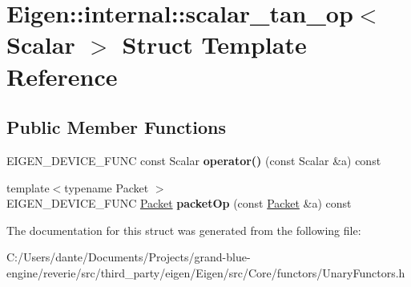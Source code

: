\hypertarget{struct_eigen_1_1internal_1_1scalar__tan__op}{}\section{Eigen\+::internal\+::scalar\+\_\+tan\+\_\+op$<$ Scalar $>$ Struct Template Reference}
\label{struct_eigen_1_1internal_1_1scalar__tan__op}
\subsection*{Public Member Functions}
\begin{DoxyCompactItemize}
\item 
\mbox{\label{struct_eigen_1_1internal_1_1scalar__tan__op_a9508b4ec252b7727df8f269e012fe779}} 
E\+I\+G\+E\+N\+\_\+\+D\+E\+V\+I\+C\+E\+\_\+\+F\+U\+NC const Scalar {\bfseries operator()} (const Scalar \&a) const
\item 
\mbox{\label{struct_eigen_1_1internal_1_1scalar__tan__op_a94f05f71b29802eb1f0c4f5af2d50e67}} 
{\footnotesize template$<$typename Packet $>$ }\\E\+I\+G\+E\+N\+\_\+\+D\+E\+V\+I\+C\+E\+\_\+\+F\+U\+NC \mbox{\hyperlink{union_eigen_1_1internal_1_1_packet}{Packet}} {\bfseries packet\+Op} (const \mbox{\hyperlink{union_eigen_1_1internal_1_1_packet}{Packet}} \&a) const
\end{DoxyCompactItemize}


The documentation for this struct was generated from the following file\+:\begin{DoxyCompactItemize}
\item 
C\+:/\+Users/dante/\+Documents/\+Projects/grand-\/blue-\/engine/reverie/src/third\+\_\+party/eigen/\+Eigen/src/\+Core/functors/Unary\+Functors.\+h\end{DoxyCompactItemize}
